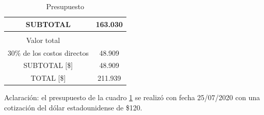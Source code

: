 \documentclass[11pt]{charter}
\begin{document}
\begin{table}[htpb]
\begin{tabularx}{\linewidth}{@{}|p{1em}|X|X|X|X|@{}}
\multicolumn{4}{|c|}{SUBTOTAL} &
  \multicolumn{1}{c|}{163.030} \\ \hline
\rowcolor[HTML]{C0C0C0} 
\multicolumn{5}{|c|}{\cellcolor[HTML]{C0A0C0}COSTOS INDIRECTOS [\$]} \\ \hline
\rowcolor[HTML]{C0C0C0} 
\multicolumn{4}{|c|}{Descripción} &
  \multicolumn{1}{c|}{\cellcolor[HTML]{B0B0B0}Valor total} \\ \hline
\multicolumn{4}{|c|}{30\% de los costos directos} &
  \multicolumn{1}{c|}{48.909} \\ \hline
  
\multicolumn{4}{|c|}{SUBTOTAL [\$]} &
  \multicolumn{1}{c|}{48.909} \\ \hline
\multicolumn{4}{|c|}{\cellcolor[HTML]{B0B0B0}TOTAL [\$]} &
  \multicolumn{1}{c|}{\cellcolor[HTML]{B0B0B0}211.939} \\ \hline   
\end{tabularx}
\caption{Presupuesto}
\label{tab:Presupuesto}
\end{table}


Aclaración: el presupuesto de la cuadro \ref{tab:Presupuesto} se realizó con fecha 25/07/2020 con una cotización del dólar estadounidense de \$120.

\vspace{40em}
\end{document}
